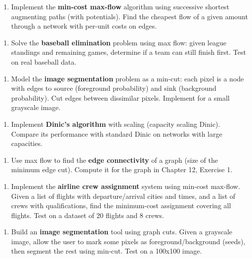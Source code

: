 \begin{enumerate}
\item Implement the \textbf{min-cost max-flow} algorithm using successive shortest augmenting paths (with potentials). Find the cheapest flow of a given amount through a network with per-unit costs on edges.
\end{enumerate}

\begin{enumerate}
\item Solve the \textbf{baseball elimination} problem using max flow: given league standings and remaining games, determine if a team can still finish first. Test on real baseball data.
\end{enumerate}

\begin{enumerate}
\item Model the \textbf{image segmentation} problem as a min-cut: each pixel is a node with edges to source (foreground probability) and sink (background probability). Cut edges between dissimilar pixels. Implement for a small grayscale image.
\end{enumerate}

\begin{enumerate}
\item Implement \textbf{Dinic's algorithm} with scaling (capacity scaling Dinic). Compare its performance with standard Dinic on networks with large capacities.
\end{enumerate}

\begin{enumerate}
\item Use max flow to find the \textbf{edge connectivity} of a graph (size of the minimum edge cut). Compute it for the graph in Chapter 12, Exercise 1.
\end{enumerate}

\begin{enumerate}
\item Implement the \textbf{airline crew assignment} system using min-cost max-flow. Given a list of flights with departure/arrival cities and times, and a list of crews with qualifications, find the minimum-cost assignment covering all flights. Test on a dataset of 20 flights and 8 crews.
\end{enumerate}

\begin{enumerate}
\item Build an \textbf{image segmentation} tool using graph cuts. Given a grayscale image, allow the user to mark some pixels as foreground/background (seeds), then segment the rest using min-cut. Test on a 100x100 image.
\end{enumerate}

